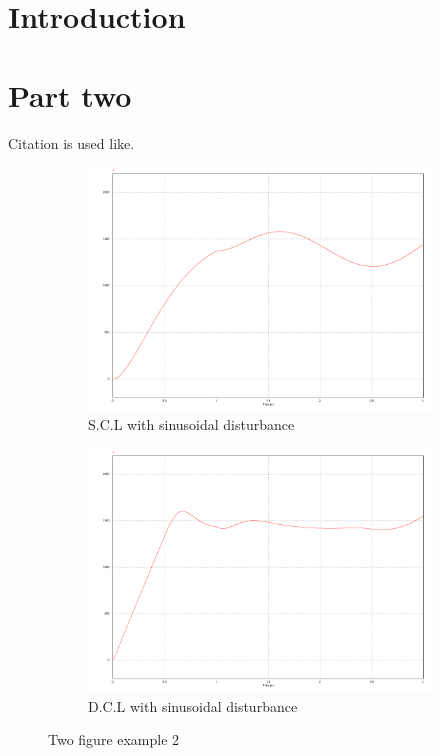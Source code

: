 \documentclass[11pt,english, openany]{book}
\begin{document}
\chapter{Introduction}\label{chapt:intro}



\lipsum[1]

\vspace{0.6cm}
\begin{tcolorbox}[title=\textbf{tcolorbox example}]
	\lipsum[2]
\end{tcolorbox}

\chapter{Part two}
Citation is used like\cite{ex}.

\begin{figure}[H]
	\centering
	\begin{subfigure}{0.49\linewidth} \centering
		\includegraphics[scale=0.25]{Figures/single_sine_perturb}
		\caption{S.C.L with sinusoidal disturbance}\label{fig:figA}
	\end{subfigure}
	\begin{subfigure}{0.49\linewidth} \centering
		\includegraphics[scale=0.25]{Figures/dual_sine_perturb}
		\caption{D.C.L with sinusoidal disturbance}\label{fig:figB}
	\end{subfigure}
	\caption{Two figure example 2} \label{fig:twodisturb}
\end{figure}
\end{document}
